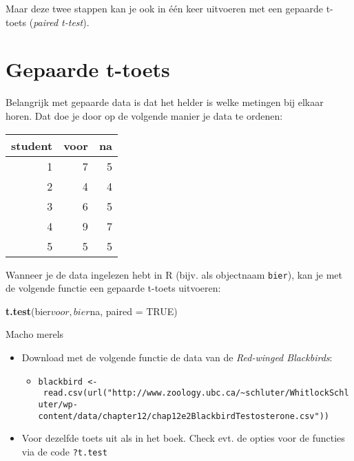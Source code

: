 \documentclass[]{book}
\newenvironment{Shaded}{\begin{snugshade}}{\end{snugshade}}
\newcommand{\KeywordTok}[1]{\textcolor[rgb]{0.13,0.29,0.53}{\textbf{{#1}}}}
\newcommand{\DataTypeTok}[1]{\textcolor[rgb]{0.13,0.29,0.53}{{#1}}}
\newcommand{\OtherTok}[1]{\textcolor[rgb]{0.56,0.35,0.01}{{#1}}}
\newcommand{\NormalTok}[1]{{#1}}
\providecommand{\tightlist}{%
  \setlength{\itemsep}{0pt}\setlength{\parskip}{0pt}}
\theoremstyle{definition}
\theoremstyle{definition}
\theoremstyle{definition}
\theoremstyle{remark}
\let\BeginKnitrBlock\begin \let\EndKnitrBlock\end
\begin{document}
Maar deze twee stappen kan je ook in één keer uitvoeren met een gepaarde
t-toets (\emph{paired t-test}).

\section{Gepaarde t-toets}\label{gepaarde-t-toets-1}

Belangrijk met gepaarde data is dat het helder is welke metingen bij
elkaar horen. Dat doe je door op de volgende manier je data te ordenen:

\begin{tabular}{r|r|r}
\hline
student & voor & na\\
\hline
1 & 7 & 5\\
\hline
2 & 4 & 4\\
\hline
3 & 6 & 5\\
\hline
4 & 9 & 7\\
\hline
5 & 5 & 5\\
\hline
\end{tabular}

Wanneer je de data ingelezen hebt in R (bijv. als objectnaam
\texttt{bier}), kan je met de volgende functie een gepaarde t-toets
uitvoeren:

\begin{Shaded}
\begin{Highlighting}[]
\KeywordTok{t.test}\NormalTok{(bier$voor, bier$na, }\DataTypeTok{paired =} \OtherTok{TRUE}\NormalTok{)}
\end{Highlighting}
\end{Shaded}

\BeginKnitrBlock{exercise}
\protect\hypertarget{exr:machomerels}{}{\label{exr:machomerels} }Macho
merels

\begin{itemize}
\tightlist
\item
  Download met de volgende functie de data van de \emph{Red-winged
  Blackbirds}:

  \begin{itemize}
  \tightlist
  \item
    \texttt{blackbird\ \textless{}-\ read.csv(url("http://www.zoology.ubc.ca/\textasciitilde{}schluter/WhitlockSchluter/wp-content/data/chapter12/chap12e2BlackbirdTestosterone.csv"))}
  \end{itemize}
\item
  Voor dezelfde toets uit als in het boek. Check evt. de opties voor de
  functies via de code \texttt{?t.test}
\end{itemize}
\EndKnitrBlock{exercise}
\end{document}
